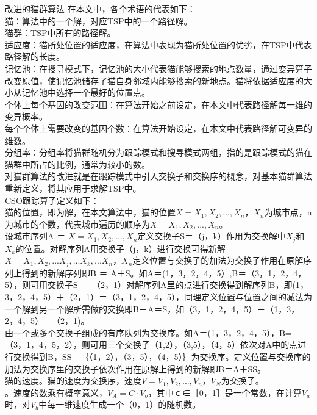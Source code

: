 \documentclass[UTF8]{ctexart}
\begin{document}
\begin{subsection}
{改进的猫群算法} 在本文中，各个术语的代表如下：
\\ \indent 猫：算法中的一个解，对应TSP中的一个路径解。
\\ \indent 猫群：TSP中所有的路径解。
\\ \indent 适应度：猫所处位置的适应度，在算法中表现为猫所处位置的优劣，在TSP中代表路径解的长度。
\\ \indent 记忆池：在搜寻模式下，记忆池的大小代表猫能够搜索的地点数量，通过变异算子改变原值，使记忆池储存了猫自身邻域内能够搜索的新地点。猫将依据适应度的大小从记忆池中选择一个最好的位置点。
\\ \indent 个体上每个基因的改变范围：在算法开始之前设定，在本文中代表路径解每一维的变异概率。
\\ \indent 每个个体上需要改变的基因个数：在算法开始设定，在本文中代表路径解可变异的维数。
\\ \indent 分组率：分组率将猫群随机分为跟踪模式和搜寻模式两组，指的是跟踪模式的猫在猫群中所占的比例，通常为较小的数。
\\ \indent 对猫群算法的改进就是在跟踪模式中引入交换子和交换序的概念，对基本猫群算法重新定义，将其应用于求解TSP中。
\\ \indent CSO跟踪算子定义如下：
\\ \indent 猫的位置，即为解，在本文算法中，猫的位置$X = {X_1,X_2,...,X_n}$，$X_n$为城市点，n为城市的个数，代表城市遍历的顺序为$X = {X_1,X_2,...,X_n}$。
\\ \indent 设城市序列A ＝ $X = {X_1,X_2,...,X_n}$定义交换子S＝（j，k）作用为交换解中$X_j$和$X_k$的位置。对解序列A用交换子（j，k）进行交换可得新解$X = {X_1,X_2,...X_j,...X_k,...X_n}$，$X_n$定义位置与交换子的加法为交换子作用在原解序列上得到的新解序列即B ＝ A＋S。如A＝(1，3，2，4，5）,B＝（3，1，2，4，5），则可用交换子S ＝ （2，1）对解序列A里的点进行交换得到解序列B，即(1，3，2，4，5）＋（2，1）＝（3，1，2，4，5），同理定义位置与位置之间的减法为一个解到另一个解所需做的交换即B－A＝S，如（3，1，2，4，5）－（1，3，2，4，5）＝（2，1)。
\\ \indent 由一个或多个交换子组成的有序队列为交换序。如A＝(1，3，2，4，5），B=（3，1，4，5，2），则可用三个交换子（1,2），（3,5），（4，5）依次对A中的点进行交换得到B，SS＝｛（1，2），（3，5），（4，5）｝为交换序。定义位置与交换序的加法为交换序里的交换子依次作用在原解上得到的新解即B＝A＋SS。
\\ \indent 猫的速度。猫的速度为交换序，速度$V = {V_1,V_2,...,V_n}$，$V_N$为交换子。
\\ 。速度的数乘有概率意义，$V_A = {C·V_b}$，其中ｃ∈［0，1］是一个常数，在计算$V_a$时，对$V_b$中每一维速度生成一个（0，1）的随机数。

\end{subsection}
\end{document}
